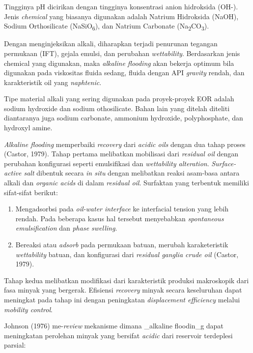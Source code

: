 \documentclass[
]{book}
\providecommand{\tightlist}{%
  \setlength{\itemsep}{0pt}\setlength{\parskip}{0pt}}
\begin{document}
Tingginya pH dicirikan dengan tingginya konsentrasi anion hidroksida (OH-). Jenis \emph{chemical} yang biasanya digunakan adalah Natrium Hidroksida (NaOH), Sodium Orthosilicate (NaSiO\textsubscript{6}), dan Natrium Carbonate (Na\textsubscript{2}CO\textsubscript{3}).

Dengan menginjeksikan alkali, diharapkan terjadi penurunan tegangan permukaan (IFT), gejala emulsi, dan perubahan \emph{wettability}. Berdasarkan jenis chemical yang digunakan, maka \emph{alkaline flooding} akan bekerja optimum bila digunakan pada viskositas fluida sedang, fluida dengan API \emph{gravity} rendah, dan karakteristik oil yang \emph{naphtenic}.

Tipe material alkali yang sering digunakan pada proyek-proyek EOR adalah sodium hydroxide dan sodium othosilicate. Bahan lain yang ditelah diteliti diantaranya juga sodium carbonate, ammonium hydroxide, polyphosphate, dan hydroxyl amine.

\emph{Alkaline flooding} memperbaiki \emph{recovery} dari \emph{acidic oils} dengan dua tahap proses (Castor, 1979). Tahap pertama melibatkan mobilisasi dari \emph{residual oil} dengan perubahan konfigurasi seperti emulsifikasi dan \emph{wettability alteration}. \emph{Surface-active salt} dibentuk secara \emph{in situ} dengan melibatkan reaksi asam-basa antara alkali dan \emph{organic acids} di dalam \emph{residual oil}. Surfaktan yang terbentuk memiliki sifat-sifat berikut:

\begin{enumerate}
\def\labelenumi{\arabic{enumi}.}
\tightlist
\item
  Mengadsorbsi pada \emph{oil-water interface} ke interfacial tension yang lebih rendah. Pada beberapa kasus hal tersebut menyebabkan \emph{spontaneous emulsification} dan \emph{phase swelling}.
\item
  Bereaksi atau \emph{adsorb} pada permukaan batuan, merubah karaketeristik \emph{wettability} batuan, dan konfigurasi dari \emph{residual ganglia crude oil} (Castor, 1979).
\end{enumerate}

Tahap kedua melibatkan modifikasi dari karakteristik produksi makroskopik dari fasa minyak yang bergerak. Efisiensi \emph{recovery} minyak secara keseluruhan dapat meningkat pada tahap ini dengan peningkatan \emph{displacement efficiency} melalui \emph{mobility control}.

Johnson (1976) me-\emph{review} mekanisme dimana \_alkaline floodin\_g dapat meningkatan perolehan minyak yang bersifat \emph{acidic} dari reservoir terdeplesi parsial:
\end{document}
